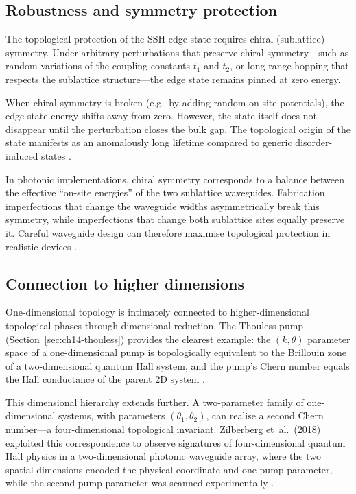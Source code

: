 \subsection{Robustness and symmetry protection}
\label{sec:ch14-robustness}

The topological protection of the SSH edge state requires chiral
(sublattice) symmetry.  Under arbitrary perturbations that preserve
chiral symmetry---such as random variations of the coupling
constants $t_1$ and $t_2$, or long-range hopping that respects the
sublattice structure---the edge state remains pinned at zero energy.

When chiral symmetry is broken (e.g.\ by adding random on-site
potentials), the edge-state energy shifts away from zero.  However,
the state itself does not disappear until the perturbation closes
the bulk gap.  The topological origin of the state manifests as an
anomalously long lifetime compared to generic disorder-induced states
\cite{ozawa2018topological}.

In photonic implementations, chiral symmetry corresponds to a
balance between the effective ``on-site energies'' of the two
sublattice waveguides.  Fabrication imperfections that change the
waveguide widths asymmetrically break this symmetry, while
imperfections that change both sublattice sites equally preserve it.
Careful waveguide design can therefore maximise topological protection
in realistic devices \cite{wu2015scheme,price2022roadmap}.

\subsection{Connection to higher dimensions}
\label{sec:ch14-higher-dim-connection}

One-dimensional topology is intimately connected to higher-dimensional
topological phases through dimensional reduction.  The Thouless pump
(Section~\ref{sec:ch14-thouless}) provides the clearest example: the
$(k, \theta)$ parameter space of a one-dimensional pump is
topologically equivalent to the Brillouin zone of a two-dimensional
quantum Hall system, and the pump's Chern number equals the Hall
conductance of the parent 2D system \cite{thouless1982quantized}.

This dimensional hierarchy extends further.  A two-parameter family of
one-dimensional systems, with parameters $(\theta_1, \theta_2)$, can
realise a second Chern number---a four-dimensional topological
invariant.  Zilberberg et~al.\ (2018) exploited this correspondence
to observe signatures of four-dimensional quantum Hall physics in a
two-dimensional photonic waveguide array, where the two spatial
dimensions encoded the physical coordinate and one pump parameter,
while the second pump parameter was scanned experimentally
\cite{price2022roadmap,ozawa2018topological}.

